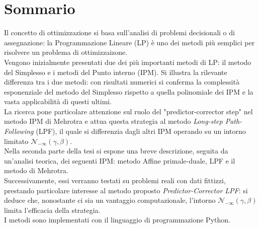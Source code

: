 \documentclass[a4paper,10 pt,titlepage,twoside]{book}
\theoremstyle{plain}
\theoremstyle{definition}
\theoremstyle{remark}
\begin{document}
\chapter*{Sommario}
Il concetto di ottimizzazione si basa sull'analisi di problemi decisionali o di assegnazione: la Programmazione Lineare (LP) è uno dei metodi più semplici per risolvere un problema di ottimizzaizone.\\ 
Vengono inizialmente presentati due dei più importanti metodi di LP: il metodo del Simplesso e i metodi del Punto interno (IPM). Si illustra la rilevante differenza tra i due metodi: con risultati numerici si conferma la complessità esponenziale del metodo del Simplesso rispetto a quella polinomiale dei IPM e la vasta applicabilità di questi ultimi.\\
La ricerca pone particolare attenzione sul ruolo del "predictor-corrector step" nel metodo IPM di Mehrotra e attua questa strategia al metodo \textit{Long-step Path-Following} (LPF), il quale si differenzia dagli altri  IPM operando su un intorno limitato $\mathcal{N}_{-\infty}(\gamma,\beta)$.\\
Nella seconda parte della tesi si espone una breve descrizione, seguita da un'analisi teorica, dei seguenti IPM: metodo Affine primale-duale, LPF e il metodo di Mehrotra.\\
Successivamente, essi verranno testati su problemi reali con dati fittizzi, prestando particolare interesse al metodo proposto \textit{Predictor-Corrector LPF}: si deduce che, nonostante ci sia un vantaggio computazionale, l'intorno $\mathcal{N}_{-\infty}(\gamma,\beta)$ limita l'efficacia della strategia.\\   
I metodi sono implementati con il linguaggio di programmazione Python. 
\end{document}
